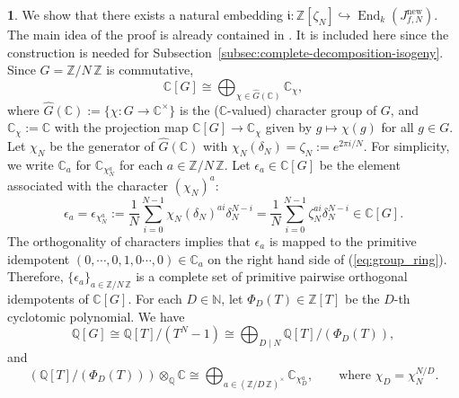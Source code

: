 \documentclass{amsart}[11pt]
\theoremstyle{definition}
\newtheorem{sect}[thm]{}
\numberwithin{equation}{section}
\theoremstyle{notitle}
\begin{document}
\begin{sect}\label{subsec:endormorphism-algebra-contain-cyclotoic-field}
  We show that there exists a natural embedding ${\mathfrak{i}}:
  {\mathbb{Z}}[\zeta_N]\hookrightarrow \operatorname{End}_k(J_{f,N}^{\mathrm{new}})$. The main idea of
  the proof is already contained in \cite[Lemma 5.2]{MR1708603}. It is
  included here since the construction is needed for
  Subsection~\ref{subsec:complete-decomposition-isogeny}.  Since $G=
  {\mathbb{Z}/ {N}\, \mathbb{Z}}$ is commutative,
  \begin{equation}
    \label{eq:group_ring}
 {\mathbb{C}}[G]\cong \bigoplus_{\chi\in \widehat{G}({\mathbb{C}})} {\mathbb{C}}_\chi,     
  \end{equation}
  where $\widehat{G}({\mathbb{C}}):=\{\chi: G \to {\mathbb{C}}^\times\}$ is the
  (${\mathbb{C}}$-valued) character group of $G$, and ${\mathbb{C}}_\chi:={\mathbb{C}}$ with the
  projection map ${\mathbb{C}}[G]\to {\mathbb{C}}_\chi$ given by $g\mapsto \chi(g)$ for
  all $g\in G$. Let $\chi_N$ be the generator of $\widehat{G}({\mathbb{C}})$
  with $\chi_N(\delta_N)=\zeta_N:=e^{2\pi i/N}$.  For simplicity, we
  write ${\mathbb{C}}_a$ for ${\mathbb{C}}_{\chi_N^a}$ for each $a\in {\mathbb{Z}/ {N}\, \mathbb{Z}}$. Let
  $\epsilon_a\in {\mathbb{C}}[G]$ be the element associated with the character
  $(\chi_N)^a$:
\begin{equation}
  \label{eq:idempotent}
  \epsilon_a=\epsilon_{\chi_N^a}:=\frac{1}{N}\sum_{i=0}^{N-1}
   \chi_N(\delta_N)^{ai}\delta_N^{N-i}=\frac{1}{N}\sum_{i=0}^{N-1}
   \zeta_N^{ai}\delta_N^{N-i}\in {\mathbb{C}}[G].
\end{equation}
The orthogonality of characters implies that $\epsilon_a$ is mapped to
the primitive idempotent $(0,\cdots, 0, 1,0\cdots, 0)\in
{\mathbb{C}}_a$ on the right hand side of
(\ref{eq:group_ring}). Therefore, $\{\epsilon_a\}_{a\in {\mathbb{Z}/ {N}\, \mathbb{Z}}}$ is
a complete set of primitive pairwise orthogonal idempotents of
${\mathbb{C}}[G]$. For each $D\in {\mathbb{N}}$, let $\Phi_D(T)\in {\mathbb{Z}}[T]$ be the $D$-th
cyclotomic polynomial. We have
\begin{equation}
  \label{eq:cyclotomic_factorization}
  {\mathbb{Q}}[G]\cong {\mathbb{Q}}[T]/(T^N-1)\cong \bigoplus_{D\mid N}
  {\mathbb{Q}}[T]/(\Phi_D(T)),
\end{equation}
and
\begin{equation}
  \label{eq:D-cyclotomic-factor-over-cc}
  \left({\mathbb{Q}}[T]/(\Phi_D(T))\right)\otimes_{\mathbb{Q}} {\mathbb{C}} \cong \bigoplus_{a\in
    {(\mathbb{Z}/ {D}\, \mathbb{Z})^\times}} {\mathbb{C}}_{\chi_D^a}, \qquad \text{where } \chi_D=\chi_N^{N/D}.

\end{equation}
\end{sect}
\end{document}
